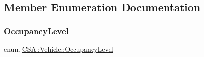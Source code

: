 \subsection{Member Enumeration Documentation}
\mbox{\label{classCSA_1_1Vehicle_a331cc81107e5f0a8f37f894729dd9bda}} 
\subsubsection{\texorpdfstring{Occupancy\+Level}{OccupancyLevel}}
{\footnotesize\ttfamily enum \mbox{\hyperlink{classCSA_1_1Vehicle_a331cc81107e5f0a8f37f894729dd9bda}{C\+S\+A\+::\+Vehicle\+::\+Occupancy\+Level}}\hspace{0.3cm}{\ttfamily [strong]}}

